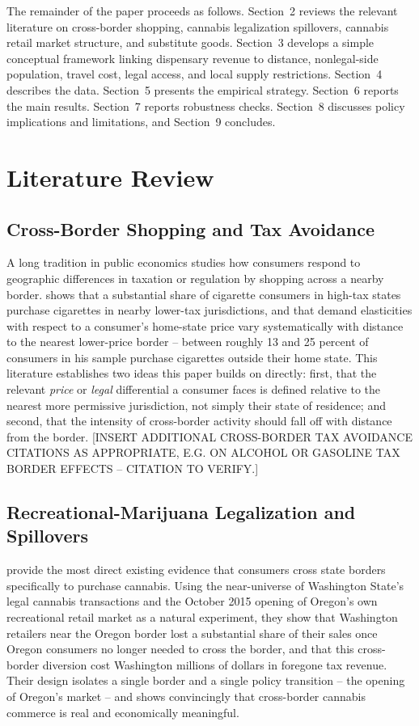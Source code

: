 \documentclass[12pt]{article}
\begin{document}
The remainder of the paper proceeds as follows. Section~2 reviews the relevant literature on cross-border
shopping, cannabis legalization spillovers, cannabis retail market structure, and substitute goods.
Section~3 develops a simple conceptual framework linking dispensary revenue to distance, nonlegal-side
population, travel cost, legal access, and local supply restrictions. Section~4 describes the data.
Section~5 presents the empirical strategy. Section~6 reports the main results. Section~7 reports robustness
checks. Section~8 discusses policy implications and limitations, and Section~9 concludes.

\section{Literature Review}

\subsection{Cross-Border Shopping and Tax Avoidance}

A long tradition in public economics studies how consumers respond to geographic differences in taxation or
regulation by shopping across a nearby border. \citet{Lovenheim2008} shows that a substantial share of
cigarette consumers in high-tax states purchase cigarettes in nearby lower-tax jurisdictions, and that
demand elasticities with respect to a consumer's home-state price vary systematically with distance to the
nearest lower-price border -- between roughly 13 and 25 percent of consumers in his sample purchase
cigarettes outside their home state. This literature establishes two ideas this paper builds on directly:
first, that the relevant \emph{price} or \emph{legal} differential a consumer faces is defined relative to
the nearest more permissive jurisdiction, not simply their state of residence; and second, that the
intensity of cross-border activity should fall off with distance from the border. [INSERT ADDITIONAL
CROSS-BORDER TAX AVOIDANCE CITATIONS AS APPROPRIATE, E.G. ON ALCOHOL OR GASOLINE TAX BORDER EFFECTS --
CITATION TO VERIFY.]

\subsection{Recreational-Marijuana Legalization and Spillovers}

\citet{HansenMillerWeber2020} provide the most direct existing evidence that consumers cross state borders
specifically to purchase cannabis. Using the near-universe of Washington State's legal cannabis
transactions and the October 2015 opening of Oregon's own recreational retail market as a natural
experiment, they show that Washington retailers near the Oregon border lost a substantial share of their
sales once Oregon consumers no longer needed to cross the border, and that this cross-border diversion cost
Washington millions of dollars in foregone tax revenue. Their design isolates a single border and a single
policy transition -- the opening of Oregon's market -- and shows convincingly that cross-border cannabis
commerce is real and economically meaningful.
\end{document}
